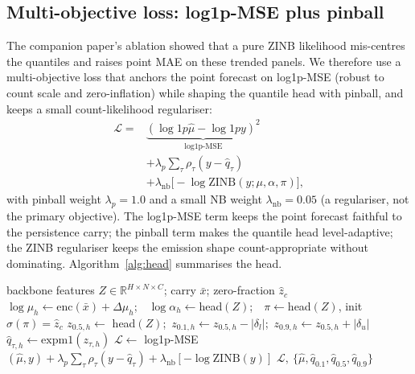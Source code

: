 \documentclass[11pt,conference]{IEEEtran}
\newcommand{\R}{\mathbb{R}}
\begin{document}
\subsection{Multi-objective loss: log1p-MSE plus pinball}\label{sec:loss}
The companion paper's ablation showed that a pure ZINB likelihood mis-centres the
quantiles and raises point MAE on these trended panels. We therefore use a
multi-objective loss that anchors the point forecast on log1p-MSE (robust to
count scale and zero-inflation) while shaping the quantile head with pinball, and
keeps a small count-likelihood regulariser:
\begin{equation}\label{eq:loss}
\begin{split}
  \mathcal{L}={}&\underbrace{(\log1p\hat\mu-\log1p y)^2}_{\text{log1p-MSE}}\\
  &+\lambda_p\!\sum_\tau\!\rho_\tau(y-\hat q_\tau)\\
  &+\lambda_{\mathrm{nb}}\big[-\log \mathrm{ZINB}(y;\mu,\alpha,\pi)\big],
\end{split}
\end{equation}
with pinball weight $\lambda_p{=}1.0$ and a small NB weight
$\lambda_{\mathrm{nb}}{=}0.05$ (a regulariser, not the primary objective). The
log1p-MSE term keeps the point forecast faithful to the persistence carry; the
pinball term makes the quantile head level-adaptive; the ZINB regulariser keeps
the emission shape count-appropriate without dominating. Algorithm~\ref{alg:head}
summarises the head.

\begin{algorithm}[t]
\caption{Sparsity-aware calibrated count head (one training step)}\label{alg:head}
\begin{algorithmic}[1]
\Require backbone features $Z\in\R^{H\times N\times C}$; carry $\bar x$; zero-fraction $\hat z_c$
\State $\log\mu_h \gets \mathrm{enc}(\bar x)+\Delta\mu_h$;\ \ $\log\alpha_h\gets$head$(Z)$;\ \ $\pi\gets$head$(Z)$, init $\sigma(\pi)=\hat z_c$
\State $z_{0.5,h}\gets$ head$(Z)$;\ $z_{0.1,h}\gets z_{0.5,h}-|\delta_l|$;\ $z_{0.9,h}\gets z_{0.5,h}+|\delta_u|$
\State $\hat q_{\tau,h}\gets \mathrm{expm1}(z_{\tau,h})$ 
\State $\mathcal{L}\gets$ log1p-MSE$(\hat\mu,y)+\lambda_p\sum_\tau\rho_\tau(y-\hat q_\tau)+\lambda_{\mathrm{nb}}[-\log\mathrm{ZINB}(y)]$
\State \Return $\mathcal{L},\ \{\hat\mu,\hat q_{0.1},\hat q_{0.5},\hat q_{0.9}\}$
\end{algorithmic}
\end{algorithm}
\end{document}
